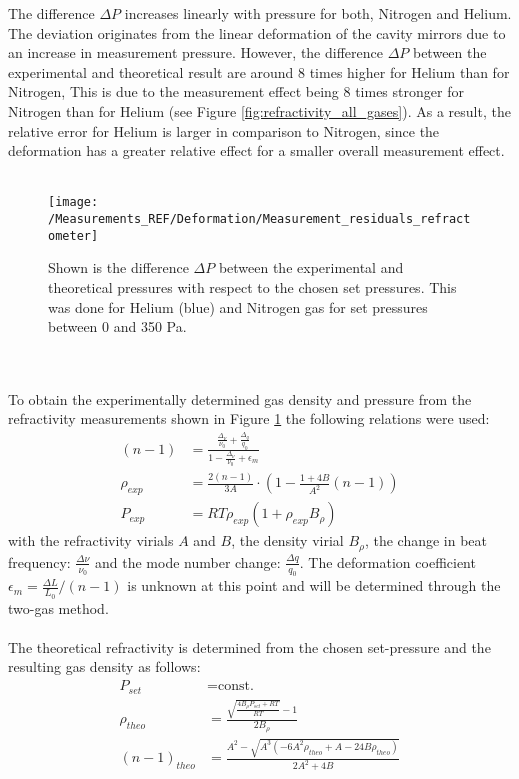 The difference $\Delta P$ increases linearly with pressure for both, Nitrogen and Helium. The deviation originates from the linear deformation of the cavity mirrors due to an increase in measurement pressure. However, the difference $\Delta P$ between the experimental and theoretical result are around 8 times higher for Helium than for Nitrogen, This is due to the measurement effect being 8 times stronger for Nitrogen than for Helium (see Figure \ref{fig:refractivity_all_gases}). As a result, the relative error for Helium is larger in comparison to Nitrogen, since the deformation has a greater relative effect for a smaller overall measurement effect.\\\\
\begin{figure}[h]
	\centering
	\texttt{[image: /Measurements\_REF/Deformation/Measurement\_residuals\_refractometer]}
	\caption{Shown is the difference $\Delta P$ between the experimental and theoretical pressures with respect to the chosen set pressures. This was done for Helium (blue) and Nitrogen gas for set pressures between 0 and 350 Pa.}
	\label{fig:Measurement_residuals_refractometer}
\end{figure}\\\\
To obtain the experimentally determined gas density and pressure from the refractivity measurements shown in Figure \ref{fig:Measurement_residuals_refractometer} the following relations were used:
\begin{align}
	(n-1) &= \frac{\frac{\Delta_{\nu}}{\nu_0}+\frac{\Delta_q}{q_0}}{1-\frac{\Delta_{\nu}}{\nu_0} +\epsilon_m}\\
	\rho_{exp} &= \frac{2(n-1)}{3A}\cdot \left(1-\frac{1+4B}{A^2}(n-1)\right)\\
	P_{exp}&=RT\rho_{exp} \left(1+\rho_{exp} B_{\rho}\right)
\end{align}
with the refractivity virials $A$ and $B$, the density virial $B_{\rho}$, the change in beat frequency: $\frac{\Delta \nu}{\nu_0}$ and the mode number change: $\frac{\Delta q}{q_0}$. The deformation coefficient $\epsilon_m = \frac{\Delta L}{L_0}/(n-1)$ is unknown at this point and will be determined through the two-gas method.\\\\
The theoretical refractivity is determined from the chosen set-pressure and the resulting gas density as follows:
\begin{align}
	P_{set} &=\text{const.}\\
	\rho_{theo} &= \frac{\sqrt{\frac{4B_{\rho}P_{set}+RT}{RT}}-1}{2B_{\rho}}\\
	(n-1)_{theo}&= \frac{A^2-\sqrt{A^3\left(-6A^2\rho_{theo}+A-24B\rho_{theo}\right)}}{2A^2+4B}
\end{align}
